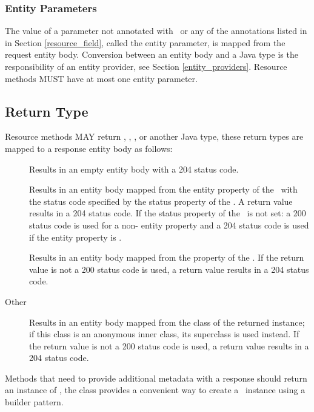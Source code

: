 \subsubsection{Entity Parameters}
\label{entity_parameters}

The value of a parameter not annotated with \FormParam\ or any of the annotations listed in in Section \ref{resource_field}, called the entity parameter, is mapped from the request entity body. Conversion between an entity body and a Java type is the responsibility of an entity provider, see Section \ref{entity_providers}. Resource methods MUST have at most one entity parameter.

\subsection{Return Type}
\label{resource_method_return}

Resource methods MAY return , \Response, , or another Java type, these return types are mapped to a response entity body as follows:

\begin{description}
\item[] Results in an empty entity body with a 204 status code.
\item[\Response] Results in an entity body mapped from the entity property of the \Response\ with the status code specified by the status property of the \Response. A  return value results in a 204 status code. If the status property of the \Response\ is not set: a 200 status code is used for a non- entity property and a 204 status code is used if the entity property is .
\item[] Results in an entity body mapped from the  property of the . If the return value is not  a 200 status code is used, a  return value results in a 204 status code.
\item[Other] Results in an entity body mapped from the class of the returned instance; if this class is an anonymous inner class, its superclass is used instead. If the return value is not  a 200 status code is used, a  return value results in a 204 status code.
\end{description}

Methods that need to provide additional metadata with a response should return an instance of \Response, the \Response{} class provides a convenient way to create a \Response\ instance using a builder pattern.

